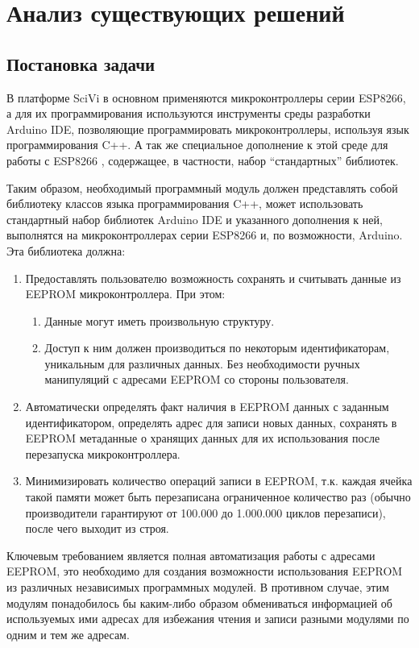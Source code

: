\chapter{Анализ существующих решений}

\section{Постановка задачи}

В платформе SciVi в основном применяются микроконтроллеры серии ESP8266, а для их программирования используются инструменты среды разработки Arduino IDE, позволяющие программировать микроконтроллеры, используя язык программирования C++.
А так же специальное дополнение к этой среде для работы с ESP8266 \cite{web:esp-core}, содержащее, в частности, набор “стандартных” библиотек.

Таким образом, необходимый программный модуль должен представлять собой библиотеку классов языка программирования C++, может использовать стандартный набор библиотек Arduino IDE и указанного дополнения к ней, выполнятся на микроконтроллерах серии ESP8266 и, по возможности, Arduino.
Эта библиотека должна:
\begin{enumerate}
	\item Предоставлять пользователю возможность сохранять и считывать данные из EEPROM микроконтроллера. При этом:
	\begin{enumerate}
		\item Данные могут иметь произвольную структуру.
		\item Доступ к ним должен производиться по некоторым  идентификаторам, уникальным для различных данных. Без необходимости ручных манипуляций с адресами EEPROM со стороны пользователя.
	\end{enumerate}
	\item Автоматически определять факт наличия в EEPROM данных с заданным идентификатором, определять адрес для записи новых данных, сохранять в EEPROM метаданные о хранящих данных для их использования после перезапуска микроконтроллера.
	\item Минимизировать количество операций записи в EEPROM, т.к. каждая ячейка такой памяти может быть перезаписана ограниченное количество раз (обычно производители гарантируют от 100.000 до 1.000.000 циклов перезаписи), после чего выходит из строя.
\end{enumerate}

Ключевым требованием является полная автоматизация работы с адресами EEPROM, это необходимо для создания возможности использования EEPROM из различных независимых программных модулей.
В противном случае, этим модулям понадобилось бы каким-либо образом обмениваться информацией об используемых ими адресах для избежания чтения и записи разными модулями по одним и тем же адресам.



